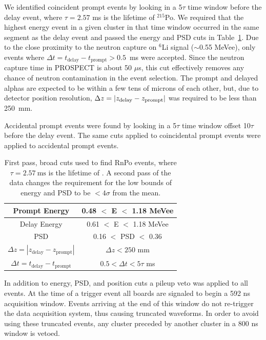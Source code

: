 We identified coincident prompt events by looking in a 5$\tau$ time window before the delay event, where $\tau = 2.57$ ms is the lifetime of $^{215}$Po.
We required that the highest energy event in a given cluster in that time window occurred in the same segment as the delay event and passed the energy and PSD cuts in Table~\ref{tab:RnPoCuts}.
Due to the close proximity to the neutron capture on $^6$Li signal ($\sim$0.55 MeVee), only events where $\Delta t = t_{\textrm{delay}}-t_{\textrm{prompt}} > 0.5$~ms were accepted.
Since the neutron capture time in PROSPECT is about 50 $\mu$s, this cut effectively removes any chance of neutron contamination in the event selection.
The prompt and delayed alphas are expected to be within a few tens of microns of each other, but, due to detector position resolution, $\Delta z = \abs{z_{\textrm{delay}} - z_{\textrm{prompt}}}$ was required to be less than 250~mm.

Accidental prompt events were found by looking in a 5$\tau$ time window offset 10$\tau$ before the delay event. 
The same cuts applied to coincidental prompt events were applied to accidental prompt events.

\begin{table}[!t]
	\centering
\begin{tabular}{c|c}
	\hline 
	Prompt Energy & 0.48 $<$ E $<$ 1.18 MeVee \\ 
	\hline 
	Delay Energy & 0.61 $<$ E $<$ 1.18 MeVee \\ 
	\hline 
	PSD & 0.16 $<$ PSD $<$ 0.36 \\ 
	\hline 
	$\Delta z = |z_{\textrm{delay}} - z_{\textrm{prompt}}|$ & $\Delta z < 250$ mm  \\ 
	\hline 
	$\Delta t = t_{\textrm{delay}} - t_{\textrm{prompt}}$ & $0.5 < \Delta t < 5\tau$ ms \\ 
	\hline 
\end{tabular} 
\caption{First pass, broad cuts used to find RnPo events, where $\tau = 2.57~\textrm{ms}$ is the lifetime of \Po. A second pass of the data changes the requirement for the low bounds of energy and PSD to be $< 4 \sigma$ from the mean.}
\label{tab:RnPoCuts}
\end{table}

In addition to energy, PSD, and position cuts a pileup veto was applied to all events.
At the time of a trigger event all boards are signaled to begin a 592 ns acquisition window. 
Events arriving at the end of this window do not re-trigger the data acquisition system, thus causing truncated waveforms.
In order to avoid using these truncated events, any cluster preceded by another cluster in a 800 ns window is vetoed. 

